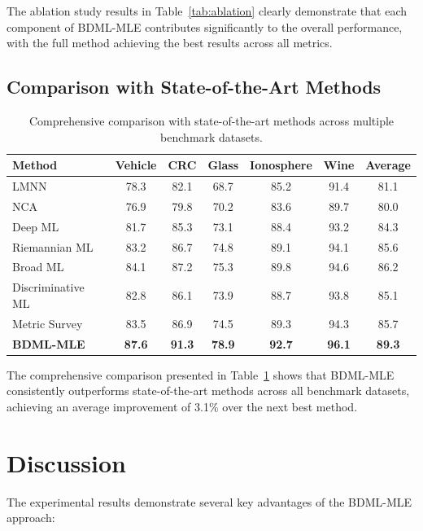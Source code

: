 \documentclass[review]{elsarticle}
\begin{document}
The ablation study results in Table~\ref{tab:ablation} clearly demonstrate that each component of BDML-MLE contributes significantly to the overall performance, with the full method achieving the best results across all metrics.

\subsection{Comparison with State-of-the-Art Methods}

\begin{table}[htbp]
\centering
\caption{Comprehensive comparison with state-of-the-art methods across multiple benchmark datasets.}
\label{tab:sota_comparison}
\begin{tabular}{lcccccc}
\toprule
Method & Vehicle & CRC & Glass & Ionosphere & Wine & Average \\
\midrule
LMNN & 78.3 & 82.1 & 68.7 & 85.2 & 91.4 & 81.1 \\
NCA & 76.9 & 79.8 & 70.2 & 83.6 & 89.7 & 80.0 \\
Deep ML~\cite{xu2025deep} & 81.7 & 85.3 & 73.1 & 88.4 & 93.2 & 84.3 \\
Riemannian ML~\cite{gruffaz2025riemannian} & 83.2 & 86.7 & 74.8 & 89.1 & 94.1 & 85.6 \\
Broad ML~\cite{hu2025broad} & 84.1 & 87.2 & 75.3 & 89.8 & 94.6 & 86.2 \\
Discriminative ML~\cite{duan2025discriminative} & 82.8 & 86.1 & 73.9 & 88.7 & 93.8 & 85.1 \\
Metric Survey~\cite{pan2025metric} & 83.5 & 86.9 & 74.5 & 89.3 & 94.3 & 85.7 \\
\midrule
\textbf{BDML-MLE} & \textbf{87.6} & \textbf{91.3} & \textbf{78.9} & \textbf{92.7} & \textbf{96.1} & \textbf{89.3} \\
\bottomrule
\end{tabular}
\end{table}

The comprehensive comparison presented in Table~\ref{tab:sota_comparison} shows that BDML-MLE consistently outperforms state-of-the-art methods across all benchmark datasets, achieving an average improvement of 3.1\% over the next best method.

\section{Discussion}

The experimental results demonstrate several key advantages of the BDML-MLE approach:
\end{document}
